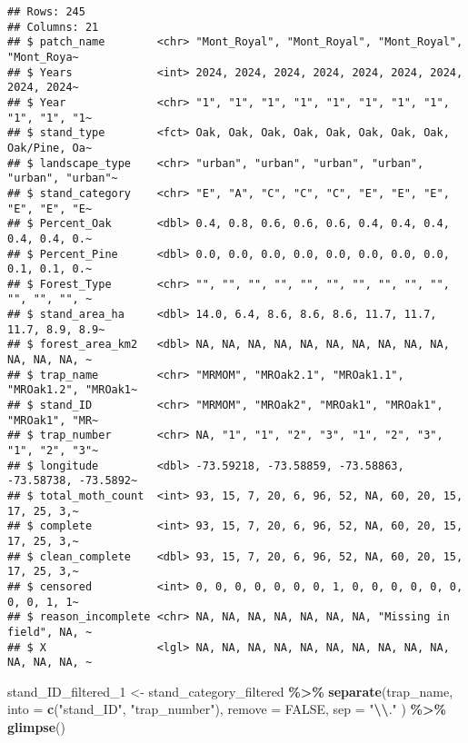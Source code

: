 \documentclass[
]{article}
\newenvironment{Shaded}{\begin{snugshade}}{\end{snugshade}}
\newcommand{\AttributeTok}[1]{\textcolor[rgb]{0.13,0.29,0.53}{#1}}
\newcommand{\ConstantTok}[1]{\textcolor[rgb]{0.56,0.35,0.01}{#1}}
\newcommand{\FunctionTok}[1]{\textcolor[rgb]{0.13,0.29,0.53}{\textbf{#1}}}
\newcommand{\NormalTok}[1]{#1}
\newcommand{\OtherTok}[1]{\textcolor[rgb]{0.56,0.35,0.01}{#1}}
\newcommand{\SpecialCharTok}[1]{\textcolor[rgb]{0.81,0.36,0.00}{\textbf{#1}}}
\newcommand{\StringTok}[1]{\textcolor[rgb]{0.31,0.60,0.02}{#1}}
\begin{document}
\begin{verbatim}
## Rows: 245
## Columns: 21
## $ patch_name        <chr> "Mont_Royal", "Mont_Royal", "Mont_Royal", "Mont_Roya~
## $ Years             <int> 2024, 2024, 2024, 2024, 2024, 2024, 2024, 2024, 2024~
## $ Year              <chr> "1", "1", "1", "1", "1", "1", "1", "1", "1", "1", "1~
## $ stand_type        <fct> Oak, Oak, Oak, Oak, Oak, Oak, Oak, Oak, Oak/Pine, Oa~
## $ landscape_type    <chr> "urban", "urban", "urban", "urban", "urban", "urban"~
## $ stand_category    <chr> "E", "A", "C", "C", "C", "E", "E", "E", "E", "E", "E~
## $ Percent_Oak       <dbl> 0.4, 0.8, 0.6, 0.6, 0.6, 0.4, 0.4, 0.4, 0.4, 0.4, 0.~
## $ Percent_Pine      <dbl> 0.0, 0.0, 0.0, 0.0, 0.0, 0.0, 0.0, 0.0, 0.1, 0.1, 0.~
## $ Forest_Type       <chr> "", "", "", "", "", "", "", "", "", "", "", "", "", ~
## $ stand_area_ha     <dbl> 14.0, 6.4, 8.6, 8.6, 8.6, 11.7, 11.7, 11.7, 8.9, 8.9~
## $ forest_area_km2   <dbl> NA, NA, NA, NA, NA, NA, NA, NA, NA, NA, NA, NA, NA, ~
## $ trap_name         <chr> "MRMOM", "MROak2.1", "MROak1.1", "MROak1.2", "MROak1~
## $ stand_ID          <chr> "MRMOM", "MROak2", "MROak1", "MROak1", "MROak1", "MR~
## $ trap_number       <chr> NA, "1", "1", "2", "3", "1", "2", "3", "1", "2", "3"~
## $ longitude         <dbl> -73.59218, -73.58859, -73.58863, -73.58738, -73.5892~
## $ total_moth_count  <int> 93, 15, 7, 20, 6, 96, 52, NA, 60, 20, 15, 17, 25, 3,~
## $ complete          <int> 93, 15, 7, 20, 6, 96, 52, NA, 60, 20, 15, 17, 25, 3,~
## $ clean_complete    <dbl> 93, 15, 7, 20, 6, 96, 52, NA, 60, 20, 15, 17, 25, 3,~
## $ censored          <int> 0, 0, 0, 0, 0, 0, 0, 1, 0, 0, 0, 0, 0, 0, 0, 0, 1, 1~
## $ reason_incomplete <chr> NA, NA, NA, NA, NA, NA, NA, "Missing in field", NA, ~
## $ X                 <lgl> NA, NA, NA, NA, NA, NA, NA, NA, NA, NA, NA, NA, NA, ~
\end{verbatim}

\begin{Shaded}
\begin{Highlighting}[]
\NormalTok{stand\_ID\_filtered\_1 }\OtherTok{\textless{}{-}}\NormalTok{ stand\_category\_filtered }\SpecialCharTok{\%\textgreater{}\%} 
  \FunctionTok{separate}\NormalTok{(trap\_name, }\AttributeTok{into =} \FunctionTok{c}\NormalTok{(}\StringTok{"stand\_ID"}\NormalTok{, }\StringTok{"trap\_number"}\NormalTok{), }\AttributeTok{remove =} \ConstantTok{FALSE}\NormalTok{, }\AttributeTok{sep =} \StringTok{"}\SpecialCharTok{\textbackslash{}\textbackslash{}}\StringTok{."}\NormalTok{ ) }\SpecialCharTok{\%\textgreater{}\%} 
  \FunctionTok{glimpse}\NormalTok{()}
\end{Highlighting}
\end{Shaded}
\end{document}
